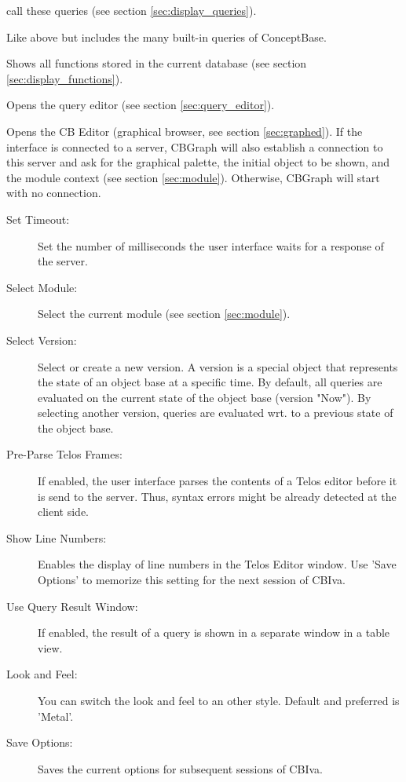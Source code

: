 \begin{description}
\begin{description}
	call these queries (see section \ref{sec:display_queries}).
        \item[Display All Queries:] Like above but includes the many built-in queries of ConceptBase.
        \item[Display Functions:] Shows all functions stored in the current database 
             (see section \ref{sec:display_functions}).
	\item[Query Editor:] Opens the query editor (see section \ref{sec:query_editor}).
	\item[Graph Editor:] Opens the CB Editor (graphical browser, see section \ref{sec:graphed}). If the
	interface is connected to a server, CBGraph will also establish a connection to this
	server and ask for the graphical palette, the initial object to be shown, and the module context (see section \ref{sec:module}). Otherwise, CBGraph will start with no connection.
	\end{description}
\item[Options:]
	\begin{description}
	\item[Set Timeout:] Set the number of milliseconds the user interface waits for a response of
	the server.
	\item[Select Module:] Select the current module (see section \ref{sec:module}).
	\item[Select Version:] Select or create a new version. A version is a special object
	that represents the state of an object base at a specific time. By default, all queries
	are evaluated on the current state of the object base (version "Now"). By selecting another
	version, queries are evaluated wrt. to a previous state of the object base.
	\item[Pre-Parse Telos Frames:] If enabled, the user interface parses the contents of
	a Telos editor before it is send to the server. Thus, syntax errors might be already
	detected at the client side.
	\item[Show Line Numbers:] Enables the display of line numbers in the Telos Editor window.
        Use 'Save Options' to memorize this setting for the next session of CBIva.
	\item[Use Query Result Window:] If enabled, the result of a query is shown in a separate window
	in a table view.
	\item[Look and Feel:] You can switch the look and feel to an other style. Default and preferred is
             'Metal'.
	\item[Save Options:] Saves the current options for subsequent sessions of CBIva.

\end{description}
\end{description}
